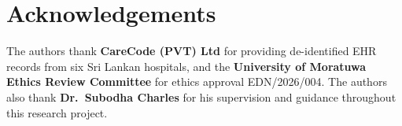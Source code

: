 \documentclass[conference]{IEEEtran}
\begin{document}
\section*{Acknowledgements}

The authors thank \textbf{CareCode (PVT) Ltd} for providing de-identified
EHR records from six Sri Lankan hospitals, and the
\textbf{University of Moratuwa Ethics Review Committee} for ethics approval
EDN/2026/004.
The authors also thank \textbf{Dr.\ Subodha Charles} for his supervision
and guidance throughout this research project.



\end{document}
